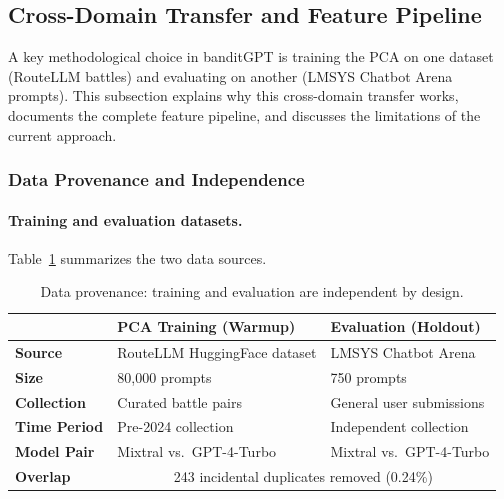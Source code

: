 
\subsection{Cross-Domain Transfer and Feature Pipeline}
\label{sec:cross_domain_transfer}

A key methodological choice in banditGPT is training the PCA on one dataset
(RouteLLM battles) and evaluating on another (LMSYS Chatbot Arena prompts).
This subsection explains why this cross-domain transfer works, documents the
complete feature pipeline, and discusses the limitations of the current
approach.

\subsubsection{Data Provenance and Independence}

\paragraph{Training and evaluation datasets.}
Table~\ref{tab:data_provenance} summarizes the two data sources.

\begin{table}[h]
\centering
\caption{Data provenance: training and evaluation are independent by design.}
\label{tab:data_provenance}
\small
\begin{tabular}{lll}
\toprule
 & \textbf{PCA Training (Warmup)} & \textbf{Evaluation (Holdout)} \\
\midrule
\textbf{Source} & RouteLLM HuggingFace dataset & LMSYS Chatbot Arena \\
\textbf{Size} & 80,000 prompts & 750 prompts \\
\textbf{Collection} & Curated battle pairs & General user submissions \\
\textbf{Time Period} & Pre-2024 collection & Independent collection \\
\textbf{Model Pair} & Mixtral vs.\ GPT-4-Turbo & Mixtral vs.\ GPT-4-Turbo \\
\textbf{Overlap} & \multicolumn{2}{c}{243 incidental duplicates removed (0.24\%)} \\
\bottomrule
\end{tabular}
\end{table}

